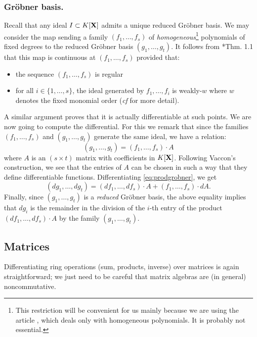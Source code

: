 \documentclass{lms}
\begin{document}
\subsubsection*{Gr\"obner basis.}

Recall that any 
ideal $I \subset K[\mathbf X]$ admits a unique reduced Gr\"obner basis. We may
consider the map sending a family $(f_1, \ldots, f_s)$ of 
\emph{homogeneous}\footnote{This restriction will be convenient for us 
mainly because we are using the article \cite{vaccon:14a}, which deals only 
with homogeneous polynomials. It is probably not essential.} 
polynomials of fixed degrees to the reduced Gr\"obner basis $(g_1, 
\ldots, g_t)$. It follows from \cite{vaccon:14a}*{Thm. 1.1} that this 
map is continuous at $(f_1, \ldots, f_s)$ provided that:
\begin{itemize}
\item the sequence $(f_1, \ldots, f_s)$ is regular
\item for all $i \in \{1, \ldots, s\}$, the ideal generated by
$f_1, \ldots, f_i$ is weakly-$w$ where $w$ denotes the fixed monomial
order (\emph{cf} \cite{vaccon:14a} for more detail).
\end{itemize}
A similar argument proves that it is actually differentiable at such
points. We are now going to compute the differential. For this we
remark that since the families $(f_1, \ldots, f_s)$ and $(g_1, \ldots,
g_t)$ generate the same ideal, we have a relation:
\begin{equation}
\label{eq:prodgrobner}
(g_1, \ldots, g_t) = (f_1, \ldots, f_s) \cdot A
\end{equation}
where $A$ is an $(s \times t)$ matrix with coefficients in $K[\mathbf X]$.
Following Vaccon's construction, we see that the entries of $A$ 
can be chosen in such a way that they define differentiable functions.
Differentiating \eqref{eq:prodgrobner}, we get
$$(d g_1, \ldots, d g_t) =
(d f_1, \ldots, d f_s) \cdot A + (f_1, \ldots, f_s) \cdot dA.$$
Finally, since $(g_1, \ldots, g_t)$ is a \emph{reduced} Gr\"obner
basis, the above equality implies that $d g_i$ is the remainder in
the division of the $i$-th entry of the product
$(d f_1, \ldots, d f_s) \cdot A$ by the family $(g_1, \ldots, g_t)$.

\subsection{Matrices}

Differentiating ring operations (sum, products, inverse) over matrices 
is again straightforward; we just need to be careful that matrix 
algebras are (in general) noncommutative.
\end{document}
